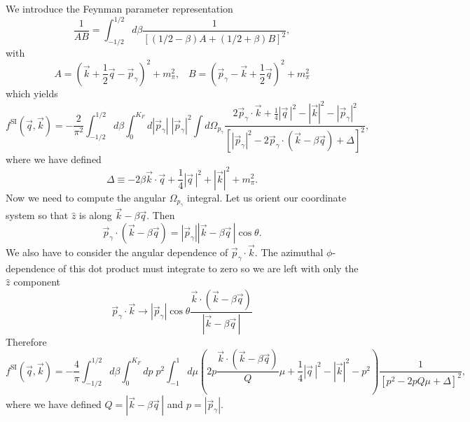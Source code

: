 \documentclass{book}[letterpaper,12pt]
\begin{document}
We introduce the Feynman parameter representation
\begin{equation}
\frac{1}{AB}=\int_{-1/2}^{1/2}d\beta \frac{1}{\left[(1/2-\beta)A+(1/2+\beta)B\right]^2},
\end{equation}
with 
\begin{equation}
A=\left(\vec{k}+\frac{1}{2}\vec{q}-\vec{p}_{\gamma}\right)^2+m_{\pi}^2,\;\;\;B=\left(\vec{p}_{\gamma}-\vec{k}+\frac{1}{2}\vec{q}\right)^2+m_{\pi}^2
\end{equation}
which yields
\begin{equation}
f^\mathrm{SI}(\vec{q},\vec{k})=-\frac{2}{\pi^2}\int_{-1/2}^{1/2}d\beta \int_0^{K_F}d|\vec{p}_{\gamma}|\;|\vec{p}_{\gamma}|^2\int d\Omega_{p_{\gamma}}\frac{2\vec{p}_{\gamma}\cdot\vec{k}+\frac{1}{4}|\vec{q}\,|^2-|\vec{k}|^2-|\vec{p}_{\gamma}|^2}{\left[|\vec{p}_{\gamma}|^2-2\vec{p}_{\gamma}\cdot\left(\vec{k}-\beta\vec{q}\right)+\Delta\right]^2},
\end{equation}
where we have defined
\begin{equation}
\Delta\equiv -2\beta\vec{k}\cdot\vec{q}+\frac{1}{4}|\vec{q}\,|^2+|\vec{k}|^2+m_{\pi}^2.
\end{equation}
Now we need to compute the angular $\Omega_{p_{\gamma}}$ integral. Let us orient our coordinate system so that $\hat{z}$ is along $\vec{k}-\beta\vec{q}$. Then
\begin{equation}
\vec{p}_{\gamma}\cdot \left(\vec{k}-\beta\vec{q}\right)=|\vec{p}_{\gamma}||\vec{k}-\beta\vec{q}\,|\cos\theta.
\end{equation}
We also have to consider the angular dependence of $\vec{p}_{\gamma}\cdot\vec{k}$. The azimuthal $\phi$-dependence of this dot product must integrate to zero so we are left with only the $\hat{z}$ component
\begin{equation}
\vec{p}_{\gamma}\cdot \vec{k}\rightarrow |\vec{p}_{\gamma}|\cos\theta \frac{\vec{k}\cdot(\vec{k}-\beta\vec{q})}{|\vec{k}-\beta\vec{q}\,|}
\end{equation}
Therefore
\begin{equation}
f^\mathrm{SI}(\vec{q},\vec{k})=-\frac{4}{\pi}\int_{-1/2}^{1/2}d\beta \int_0^{K_F}dp\;p^2 \int_{-1}^1d\mu \left(2p\frac{\vec{k}\cdot\left(\vec{k}-\beta\vec{q}\right)}{Q}\mu+\frac{1}{4}|\vec{q}\,|^2-|\vec{k}|^2-p^2\right)\frac{1}{\left[p^2-2pQ\mu+\Delta\right]^2},
\end{equation}
where we have defined $Q=|\vec{k}-\beta\vec{q}\,|$ and $p=|\vec{p}_\gamma|$.
\end{document}
